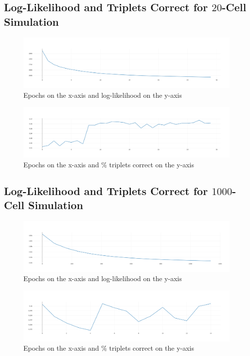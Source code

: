 \documentclass{article}
\begin{document}
\subsection*{Log-Likelihood and Triplets Correct for $20$-Cell Simulation}

\begin{figure}[h]
  \label{fig:loss_20}
  \includegraphics[width=\linewidth]{images/loss_20.png}
  \caption{Epochs on the x-axis and log-likelihood on the y-axis}
\end{figure}

\begin{figure}[h]
  \label{fig:tc_20}
  \includegraphics[width=\linewidth]{images/tc_20.png}
  \caption{Epochs on the x-axis and \% triplets correct on the y-axis}
\end{figure}

\clearpage

\subsection*{Log-Likelihood and Triplets Correct for $1000$-Cell Simulation}

\begin{figure}[h]
  \label{fig:loss_1000}
  \includegraphics[width=\linewidth]{images/loss_1000.png}
  \caption{Epochs on the x-axis and log-likelihood on the y-axis}
\end{figure}

\begin{figure}[h]
  \label{fig:tc_1000}
  \includegraphics[width=\linewidth]{images/tc_1000.png}
  \caption{Epochs on the x-axis and \% triplets correct on the y-axis}
\end{figure}
\end{document}
